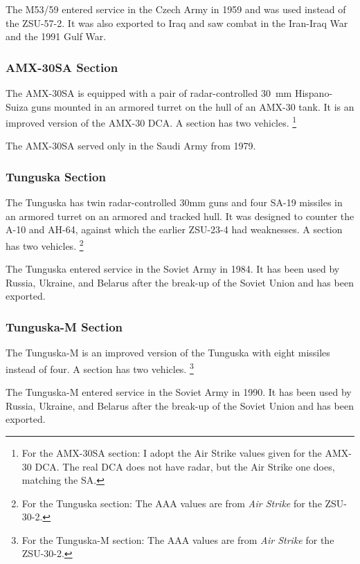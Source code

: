 \documentclass[10pt]{article}
\newcommand{\note}[1]{%
    \footnote{%
        \setlength{\parindent}{0pt}%
        \setlength{\parskip}{\smallskipamount}%
        #1
    }%
}
\begin{document}
The M53/59 entered service in the Czech Army in 1959 and was used instead of the ZSU-57-2. It was also exported to Iraq and saw combat in the Iran-Iraq War and the 1991 Gulf War.

\subsubsection{AMX-30SA Section}

The AMX-30SA is equipped with a pair of radar-controlled 30~mm Hispano-Suiza guns mounted in an armored turret on the hull of an AMX-30 tank. It is an improved version of the AMX-30 DCA. A section has two vehicles.%
\note{
    For the AMX-30SA section: I adopt the Air Strike values given for the AMX-30 DCA. The real DCA does not have radar, but the Air Strike one does, matching the SA.
}

The AMX-30SA served only in the Saudi Army from 1979.

\subsubsection{Tunguska Section}

The Tunguska has twin radar-controlled 30mm guns and four SA-19 missiles in an armored turret on an armored and tracked hull. It was designed to counter the A-10 and AH-64, against which the earlier ZSU-23-4 had weaknesses. A section has two vehicles.%
\note{
    For the Tunguska section: The AAA values are from \emph{Air Strike} for the ZSU-30-2. %
}

The Tunguska entered service in the Soviet Army in 1984. It has been used by Russia, Ukraine, and Belarus after the break-up of the Soviet Union and has been exported.

\subsubsection{Tunguska-M Section}

The Tunguska-M is an improved version of the Tunguska with eight missiles instead of four. A section has two vehicles.%
\note{
    For the Tunguska-M section: The AAA values are from \emph{Air Strike} for the ZSU-30-2. %
}

The Tunguska-M entered service in the Soviet Army in 1990. It has been used by Russia, Ukraine, and Belarus after the break-up of the Soviet Union and has been exported.
\end{document}
